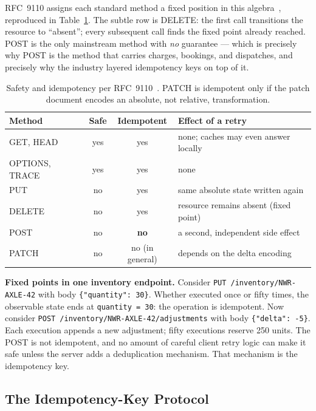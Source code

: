 RFC~9110 assigns each standard method a fixed position in this
algebra~\cite{rfc9110}, reproduced in Table~\ref{tab:ch10-methods}. The
subtle row is DELETE: the first call transitions the resource to
``absent''; every subsequent call finds the fixed point already reached.
POST is the only mainstream method with \emph{no} guarantee --- which is
precisely why POST is the method that carries charges, bookings, and
dispatches, and precisely why the industry layered idempotency keys on top
of it.

\begin{table}[h]
  \centering
  \small
  \begin{tabularx}{\textwidth}{l c c X}
    \toprule
    \textbf{Method} & \textbf{Safe} & \textbf{Idempotent} & \textbf{Effect of a retry} \\
    \midrule
    GET, HEAD & yes & yes & none; caches may even answer locally \\
    OPTIONS, TRACE & yes & yes & none \\
    PUT & no & yes & same absolute state written again \\
    DELETE & no & yes & resource remains absent (fixed point) \\
    POST & no & \textbf{no} & a second, independent side effect \\
    PATCH & no & no (in general) & depends on the delta encoding \\
    \bottomrule
  \end{tabularx}
  \caption{Safety and idempotency per RFC~9110~\cite{rfc9110}. PATCH is
  idempotent only if the patch document encodes an absolute, not relative,
  transformation.}
  \label{tab:ch10-methods}
\end{table}

\begin{examplebox}
\textbf{Fixed points in one inventory endpoint.} Consider
\texttt{PUT /inventory/NWR-AXLE-42} with body
\texttt{\{"quantity": 30\}}. Whether executed once or fifty times, the
observable state ends at \texttt{quantity = 30}: the operation is
idempotent. Now consider \texttt{POST /inventory/NWR-AXLE-42/adjustments}
with body \texttt{\{"delta": -5\}}. Each execution appends a new adjustment;
fifty executions reserve 250 units. The POST is not idempotent, and no
amount of careful client retry logic can make it safe unless the server
adds a deduplication mechanism. That mechanism is the idempotency key.
\end{examplebox}

\subsection{The Idempotency-Key Protocol}
\label{sec:ch10-idempotency-keys}


